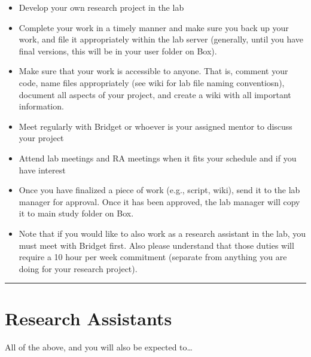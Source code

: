 \documentclass[]{book}
\providecommand{\tightlist}{%
  \setlength{\itemsep}{0pt}\setlength{\parskip}{0pt}}
\begin{document}
\begin{itemize}
\tightlist
\item
  Develop your own research project in the lab
\item
  Complete your work in a timely manner and make sure you back up your work, and file it appropriately within the lab server (generally, until you have final versions, this will be in your user folder on Box).
\item
  Make sure that your work is accessible to anyone. That is, comment your code, name files appropriately (see wiki for lab file naming conventiosn), document all aspects of your project, and create a wiki with all important information.\\
\item
  Meet regularly with Bridget or whoever is your assigned mentor to discuss your project
\item
  Attend lab meetings and RA meetings when it fits your schedule and if you have interest
\item
  Once you have finalized a piece of work (e.g., script, wiki), send it to the lab manager for approval. Once it has been approved, the lab manager will copy it to main study folder on Box.
\item
  Note that if you would like to also work as a research assistant in the lab, you must meet with Bridget first. Also please understand that those duties will require a 10 hour per week commitment (separate from anything you are doing for your research project).
\end{itemize}

\begin{center}\rule{0.5\linewidth}{0.5pt}\end{center}

\hypertarget{research-assistants}{%
\section{Research Assistants}\label{research-assistants}}

All of the above, and you will also be expected to\ldots{}
\end{document}
